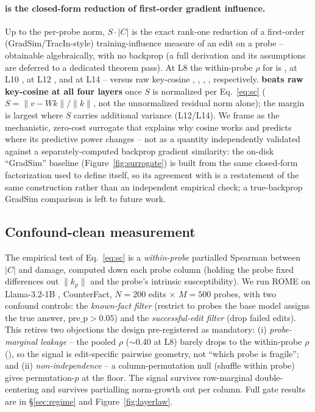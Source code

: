 \paragraph{\texorpdfstring{\SxC}{SxC} is the closed-form reduction of
first-order gradient influence.} Up to the per-probe norm, $S\cdot|C|$ is the
exact rank-one reduction of a first-order (GradSim/TracIn-style)
training-influence measure \citep{pruthi2020gradsim} of an edit on a probe --
obtainable algebraically, with no backprop (a full derivation and its
assumptions are deferred to a dedicated theorem pass). At L8 the within-probe
$\rho$ for \SxC{} is \scRhoLeight{}, at L10 \scRhoLten{}, at L12
\scRhoLtwelve{}, and at L14 \scRhoLfourteen{} -- versus raw key-cosine
\gWithinLeight{}, \gWithinLten{}, \gWithinLtwelve{}, \gWithinLfourteen{},
respectively. \textbf{\SxC{} beats raw key-cosine at all four layers} once $S$
is normalized per Eq.~\ref{eq:sc} ($S=\|v-Wk\|/\|k\|$, not the unnormalized
residual norm alone); the margin is largest where $S$ carries additional
variance (L12/L14). We frame \SxC{} as the mechanistic, zero-cost surrogate
that explains why cosine works and predicts where its predictive power
changes -- not as a quantity independently validated against a
separately-computed backprop gradient similarity: the on-disk ``GradSim''
baseline (Figure~\ref{fig:surrogate}) is built from the same closed-form
factorization used to define \SxC{} itself, so its agreement with \SxC{} is a
restatement of the same construction rather than an independent empirical
check; a true-backprop GradSim comparison is left to future work.

\subsection{Confound-clean measurement}
\label{sec:gate}
The empirical test of Eq.~\ref{eq:sc} is a \emph{within-probe} partialled
Spearman between $|C|$ and damage, computed down each probe column (holding the
probe fixed differences out $\|k_p\|$ and the probe's intrinsic
susceptibility). We run ROME on Llama-3.2-1B \citep{grattafiori2024llama3},
CounterFact, $N{=}200$ edits
$\times$ $M{=}500$ probes, with two confound controls: the \emph{known-fact
filter} (restrict to probes the base model assigns the true answer,
$\text{pre\_p}>0.05$) and the \emph{successful-edit filter} (drop failed edits). This retires two objections the design pre-registered as
mandatory: (i) \emph{probe-marginal leakage} -- the pooled $\rho$ ($\sim$0.40
at L8) barely drops to the within-probe $\rho$ (\gWithinLeight{}), so the
signal is edit-specific pairwise geometry, not ``which probe is fragile''; and
(ii) \emph{non-independence} -- a column-permutation null (shuffle within
probe) gives permutation-$p$ at the \gPermFloor{} floor. The signal survives
row-marginal double-centering and survives partialling norm-growth out per
column. Full gate results are in \S\ref{sec:regime} and
Figure~\ref{fig:layerlaw}.
